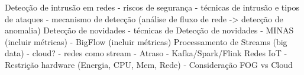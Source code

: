 Detecção de intrusão em redes
    - riscos de segurança
    - técnicas de intrusão e tipos de ataques
    - mecanismo de detecção (análise de fluxo de rede -> detecção de anomalia)
Detecção de novidades
    - técnicas de Detecção de novidades
    - MINAS (incluir métricas) 
    - BigFlow (incluir métricas)
Processamento de Streams (big data)
    - cloud?
    - redes como stream
    - Atraso
    - Kafka/Spark/Flink
Redes IoT
    - Restrição hardware (Energia, CPU, Mem, Rede)
    - Consideração FOG vs Cloud
